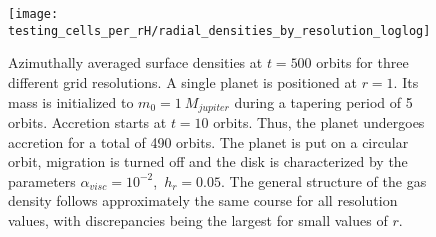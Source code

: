    \newpage

    \begin{figure}[h!]
      \centering
      \texttt{[image: testing\_cells\_per\_rH/radial\_densities\_by\_resolution\_loglog]}
      \caption{Azimuthally averaged surface densities at $t=500$ orbits for 
        three different grid resolutions. A single planet is positioned at 
        $r=1$. Its mass is initialized to $m_0=1\ M_{jupiter}$ during a tapering
        period of 5 orbits. Accretion starts at $t=10$ orbits.
        Thus, the planet undergoes accretion for a total of 490 orbits.
        The planet is put on a circular orbit, migration is 
        turned off and the disk is characterized by the parameters 
        $\alpha_{visc}=10^{-2}$,\ $h_r=0.05$.
        The general structure of the 
        gas density follows approximately the same course for all resolution 
        values, with discrepancies being the largest for small values of $r$.
      }
      \label{fig:radial_densities_for_various_resolutions}
    \end{figure} \ \\ 

